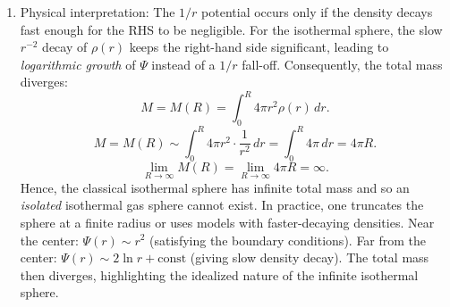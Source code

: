 \documentclass[12pt,a4paper]{article}
\numberwithin{equation}{section}
\begin{document}
\begin{enumerate}
\item Physical interpretation: The $1/r$ potential occurs only if the density decays fast enough for the RHS to be negligible. For the isothermal sphere, the slow $r^{-2}$ decay of $\rho(r)$ keeps the right-hand side significant, leading to \emph{logarithmic growth} of $\Psi$ instead of a $1/r$ fall-off. Consequently, the total mass diverges:
\begin{equation*}
M=M(R) = \int_0^R 4 \pi r^2 \rho(r) \, dr.
\end{equation*}
\begin{equation*}
M=M(R) \sim \int_0^R 4 \pi r^2 \cdot \frac{1}{r^2} \, dr = \int_0^R 4 \pi \, dr = 4 \pi R.
\end{equation*}
\begin{equation*}
\lim_{R \to \infty} M(R) = \lim_{R \to \infty} 4 \pi R = \infty.
\end{equation*}
Hence, the classical isothermal sphere has infinite total mass and so an \emph{isolated} isothermal gas sphere cannot exist. In practice, one truncates the sphere at a finite radius or uses models with faster-decaying densities. Near the center: $\Psi(r) \sim r^2$ (satisfying the boundary conditions). Far from the center: $\Psi(r) \sim 2 \ln r + \text{const}$ (giving slow density decay). The total mass then diverges, highlighting the idealized nature of the infinite isothermal sphere.
\end{enumerate}
\end{document}
